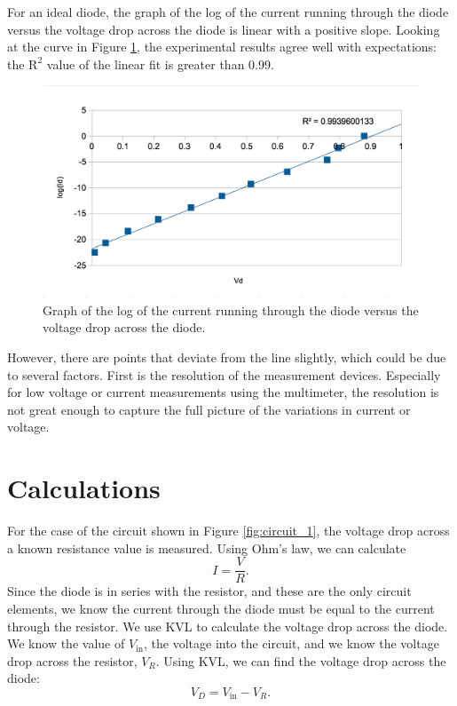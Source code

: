 \documentclass[12pt,letterpaper]{report}
\begin{document}
For an ideal diode, the graph of the log of the current running through the diode versus the voltage drop across the diode is linear with a positive slope. Looking at the curve in Figure \ref{fig:graph}, the experimental results agree well with expectations: the $\text{R}^2$ value of the linear fit is greater than 0.99.

\begin{figure}[H]
\centering
\includegraphics[width=0.9\linewidth, keepaspectratio=true]{lab3/lab3_graph.png}
\caption{Graph of the log of the current running through the diode versus the voltage drop across the diode.} %
\label{fig:graph}
\end{figure}

 However, there are points that deviate from the line slightly, which could be due to several factors. First is the resolution of the measurement devices. Especially for low voltage or current measurements using the multimeter, the resolution is not great enough to capture the full picture of the variations in current or voltage.

\section*{Calculations}

For the case of the circuit shown in Figure \ref{fig:circuit_1}, the voltage drop across a known resistance value is measured. Using Ohm's law, we can calculate
$$
I = \frac{V}{R}.
$$
Since the diode is in series with the resistor, and these are the only circuit elements, we know the current through the diode must be equal to the current through the resistor. 
We use KVL to calculate the voltage drop across the diode. We know the value of $V_{\text{in}}$, the voltage into the circuit, and we know the voltage drop across the resistor, $V_R$. Using KVL, we can find the voltage drop across the diode:
$$
V_D = V_{\text{in}} - V_R.
$$
\end{document}
